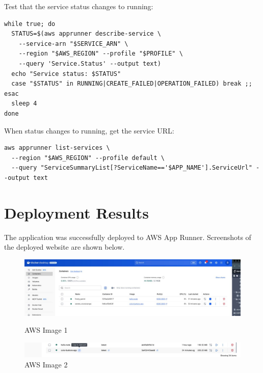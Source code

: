 Test that the service status changes to running:

\begin{verbatim}
while true; do
  STATUS=$(aws apprunner describe-service \
    --service-arn "$SERVICE_ARN" \
    --region "$AWS_REGION" --profile "$PROFILE" \
    --query 'Service.Status' --output text)
  echo "Service status: $STATUS"
  case "$STATUS" in RUNNING|CREATE_FAILED|OPERATION_FAILED) break ;; esac
  sleep 4
done
\end{verbatim}

When status changes to running, get the service URL:

\begin{verbatim}
aws apprunner list-services \
  --region "$AWS_REGION" --profile default \
  --query "ServiceSummaryList[?ServiceName=='$APP_NAME'].ServiceUrl" --output text
\end{verbatim}

\section{Deployment Results}
The application was successfully deployed to AWS App Runner. Screenshots of the deployed website are shown below.

\begin{figure}[h]
\centering
\begin{minipage}{0.48\textwidth}
  \centering
  \includegraphics[width=\textwidth]{png/aws-screenshot-1.jpeg}
  \caption{AWS Image 1}
  \label{fig:aws-1}
\end{minipage}
\hfill
\begin{minipage}{0.48\textwidth}
  \centering
  \includegraphics[width=\textwidth]{png/aws-screenshot-2.jpeg}
  \caption{AWS Image 2}
  \label{fig:aws-2}
\end{minipage}
\end{figure}

